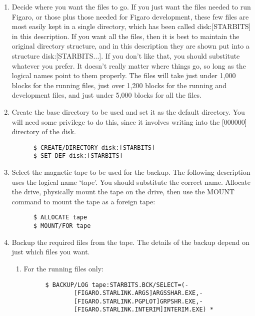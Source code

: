 \begin{enumerate}

\item Decide where you want the files to go. If you just want the files  needed
to run Figaro, or those plus those needed for Figaro development, these few
files are most easily kept in a single directory, which has been called
disk:[STARBITS] in this description. If you want all the files, then it is best
to maintain the original directory structure, and in this description they are
shown put into a structure disk:[STARBITS...]. If you don't like that, you
should substitute whatever you prefer. It doesn't really matter where things
go, so long as the logical names point to them properly. The files will take
just under  1,000 blocks for the running files, just over 1,200 blocks for the
running and development files, and just under 5,000 blocks for all the files.

\item Create the base directory to be used and set it as the default directory.
You will need some privilege to do this, since it involves writing into the
[000000] directory of the disk.

\begin{verbatim}
      $ CREATE/DIRECTORY disk:[STARBITS]
      $ SET DEF disk:[STARBITS]
\end{verbatim}

\item Select the magnetic tape to be used for the backup. The following
description uses the logical name `tape'. You should substitute the  correct
name. Allocate the drive, physically mount the tape on the drive, then use the
MOUNT command to mount the tape as a foreign tape:

\begin{verbatim}
      $ ALLOCATE tape
      $ MOUNT/FOR tape
\end{verbatim}

\item Backup the required files from the tape. The details of the backup
depend on just which files you want.

\begin{enumerate}

\item For the running files only:

\begin{verbatim}
      $ BACKUP/LOG tape:STARBITS.BCK/SELECT=(-
              [FIGARO.STARLINK.ARGS]ARGSSHAR.EXE,-
              [FIGARO.STARLINK.PGPLOT]GRPSHR.EXE,-
              [FIGARO.STARLINK.INTERIM]INTERIM.EXE) *
\end{verbatim}


\end{enumerate}
\end{enumerate}
